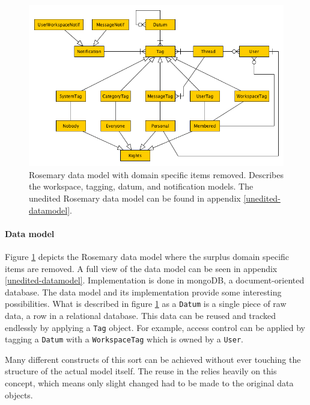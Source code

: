 \begin{figure}[!hb]
	\centering
	\includegraphics[width=1.0\linewidth]{images/datamodel-clean}
	\caption{
		Rosemary data model with domain specific items removed.
		Describes the workspace, tagging, datum, and notification models.
		The unedited Rosemary data model can be found in appendix \ref{unedited-datamodel}.
	}
	\label{fig:reuse-rosemary-dm}
\end{figure}

\paragraph{Data model}
Figure \ref{fig:reuse-rosemary-dm} depicts the Rosemary data model where the surplus domain specific items are removed.
A full view of the data model can be seen in appendix \ref{unedited-datamodel}.
Implementation is done in mongoDB, a document-oriented database.
The data model and its implementation provide some interesting possibilities.
What is described in figure \ref{fig:reuse-rosemary-dm} as a {\tt Datum} is a single piece of raw data, \ie{} a row in a relational database.
This data can be reused and tracked endlessly by applying a {\tt Tag} object.
For example, access control can be applied by tagging a {\tt Datum} with a {\tt WorkspaceTag} which is owned by a {\tt User}.

Many different constructs of this sort can be achieved without ever touching the structure of the actual model itself.
The reuse in the \ivfsystem{} relies heavily on this concept, which means only slight changed had to be made to the original data objects.